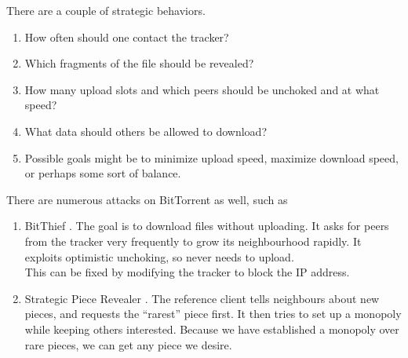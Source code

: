 		There are a couple of strategic behaviors.
		\begin{enumerate}
			\item How often should one contact the tracker?
			\item Which fragments of the file should be revealed?
			\item How many upload slots and which peers should be unchoked and at what speed?
			\item What data should others be allowed to download?
			\item Possible goals might be to minimize upload speed, maximize download speed, or perhaps some sort of balance.
		\end{enumerate}

		There are numerous attacks on BitTorrent as well, such as
		\begin{enumerate}
			\item BitThief \cite{bitthief}. The goal is to download files without uploading. It asks for peers from the tracker very frequently to grow its neighbourhood rapidly. It exploits optimistic unchoking, so never needs to upload.\\
			This can be fixed by modifying the tracker to block the IP address.
			\item Strategic Piece Revealer \cite{strategic-piece-revealer}. The reference client tells neighbours about new pieces, and requests the ``rarest'' piece first. It then tries to set up a monopoly while keeping others interested. Because we have established a monopoly over rare pieces, we can get any piece we desire. %
		\end{enumerate}